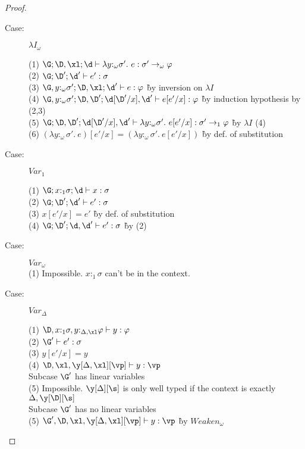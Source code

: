 \begin{proof}
\begin{description}
\item[Case:] $\lambda I_\omega$
\begin{tabbing}
  (1) $\G; \D, \xl; \d \vdash \lambda y{:}_\omega\sigma'.~e : \sigma' \to_\omega \varphi$\\
  (2) $\G; \D'; \d' \vdash e' : \sigma$\\
  (3) $\G, y{:}_\omega\sigma'; \D, \xl; \d' \vdash e : \varphi$ \` by inversion on $\lambda I$\\
  (4) $\G, y{:}_\omega\sigma'; \D, \D'; \d[\D'/x], \d' \vdash e[e'/x] : \varphi$ \` by induction hypothesis by (2,3)\\
  (5) $\G; \D,\D'; \d[\D'/x],\d' \vdash \lambda y{:}_\omega\sigma'.~e[e'/x] : \sigma' \to_1 \varphi$ \` by $\lambda I$ (4)\\
  (6) $(\lambda y{:}_\omega\sigma'.~e)[e'/x] = (\lambda y{:}_\omega\sigma'.~e[e'/x])$ \` by def. of substitution\\
\end{tabbing}

\item[Case:] $Var_1$
\begin{tabbing}
  (1) $\G;x{:}_1\sigma;\d \vdash x : \sigma$\\
  (2) $\G;\D';\d' \vdash e' : \sigma$\\
  (3) $x[e'/x] = e'$ \` by def. of substitution\\
    (4) $\G;\D';\d,\d' \vdash e' : \sigma$ \` by (2)\\ %
\end{tabbing}

\item[Case:] $Var_\omega$\\
  (1) Impossible. $x{:}_1\sigma$ can't be in the context.\\

\item[Case:] $Var_\Delta$
\begin{tabbing}
  (1) $\D, x{:}_1\sigma, y{:}_{\Delta,\xl}\varphi \vdash y : \varphi$\\
  (2) $\G' \vdash e' : \sigma$\\
  (3) $y[e'/x] = y$\\
  (4) $\D, \xl, \y[\Delta,\xl][\vp] \vdash y : \vp$\\
  Subcase $\G'$ has linear variables\\
  (5) Impossible. $\y[\Delta][\s]$ is only well typed if the context is exactly $\Delta,\y[\D][\s]$\\
  Subcase $\G'$ has no linear variables\\
  (5) $\G', \D, \xl, \y[\Delta,\xl][\vp] \vdash y : \vp$ \` by $Weaken_\omega$\\


\end{tabbing}
\end{description}
\end{proof}
